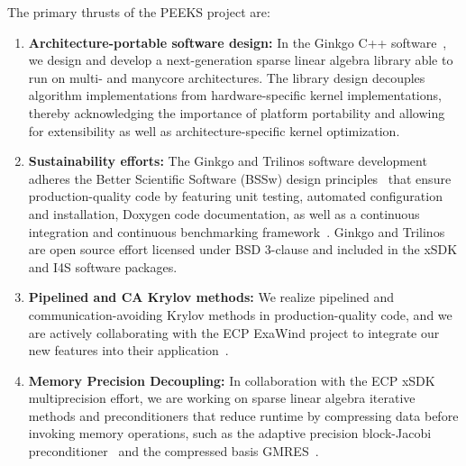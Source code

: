 The primary thrusts of the PEEKS project are:
\begin{enumerate}
    \item \textbf{Architecture-portable software design:}
	In the Ginkgo C++ software~\cite{anzt2020ginkgo}, we design and develop a 
	next-generation 
	sparse linear algebra library able to run on multi- and manycore 
	architectures. The library design decouples
	algorithm implementations from hardware-specific kernel implementations, 
	thereby acknowledging the importance of platform portability and allowing 
	for extensibility as well as architecture-specific kernel optimization. 
   \item \textbf{Sustainability efforts:}
	The Ginkgo and Trilinos software development adheres the Better Scientific 
	Software (BSSw) design principles~\cite{betterscientificsoftware} that 
	ensure production-quality code by featuring unit testing, automated 
	configuration and installation, Doxygen code documentation, as well as a 
	continuous integration and continuous benchmarking 
	framework~\cite{pasc_anzt}. Ginkgo and Trilinos are 
	open source effort licensed under BSD 3-clause and included in the xSDK and 
	I4S software packages.
   \item \textbf{Pipelined and CA Krylov methods:} 
    	We realize pipelined and 
	communication-avoiding Krylov methods in production-quality code, and 
	we are actively collaborating with the ECP ExaWind project to integrate 
        our new features into their application~\cite{Yamazaki-lowsynch}. 
	\item \textbf{Memory Precision Decoupling:}  In collaboration with the ECP 
	xSDK multiprecision effort, we are working on sparse linear algebra 
	iterative methods and preconditioners that reduce runtime by compressing 
	data before invoking memory operations, such as the adaptive precision 
	block-Jacobi preconditioner~\cite{toms_anzt} and the compressed basis 
	GMRES~\cite{aliaga2020compressed}. 
\end{enumerate}

